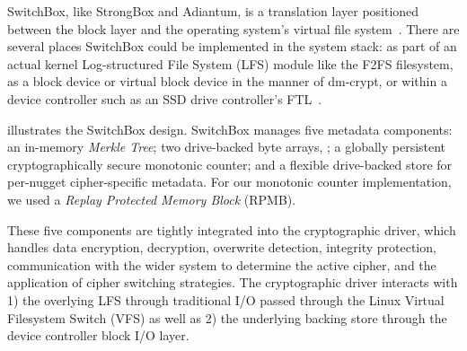 

SwitchBox, like StrongBox and Adiantum, is a translation layer positioned
between the block layer and the operating system's virtual file
system~\cite{StrongBox}. There are several places SwitchBox could be implemented
in the system stack: as part of an actual kernel Log-structured File System
(LFS) module like the F2FS filesystem, as a block device or virtual block device
in the manner of dm-crypt, or within a device controller such as an SSD drive
controller's FTL~\cite{StrongBox}.

 illustrates the SwitchBox design. SwitchBox manages five
metadata components: an in-memory \emph{Merkle Tree}; two drive-backed byte
arrays, ; a
globally persistent cryptographically secure monotonic counter; and a flexible
drive-backed store for per-nugget cipher-specific metadata. For our monotonic
counter implementation, we used a \emph{Replay Protected Memory Block} (RPMB).

These five components are tightly integrated into the cryptographic driver,
which handles data encryption, decryption, overwrite detection, integrity
protection, communication with the wider system to determine the active cipher,
and the application of cipher switching strategies. The cryptographic driver
interacts with 1) the overlying LFS through traditional I/O passed through the
Linux Virtual Filesystem Switch (VFS) as well as 2) the underlying backing store
through the device controller block I/O layer.

